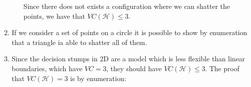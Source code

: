\begin{enumerate}
\begin{enumerate}
\begin{enumerate}
                \end{enumerate}
                Since there does not exists a configuration where we can shatter the points, we have that $V C(\mathcal{H}) \leq 3$.          
        \end{enumerate}
    \item If we consider a set of points on a circle it is possible to show by enumeration that a triangle ia able to shatter all of them.
    \item Since the decision stumps in 2D are a model which is less flexible than linear boundaries, which have $V C = 3$, they should have $V C(\mathcal{H}) \leq 3$. 
        The proof that $V C(\mathcal{H}) = 3$ is by enumeration:
\end{enumerate}